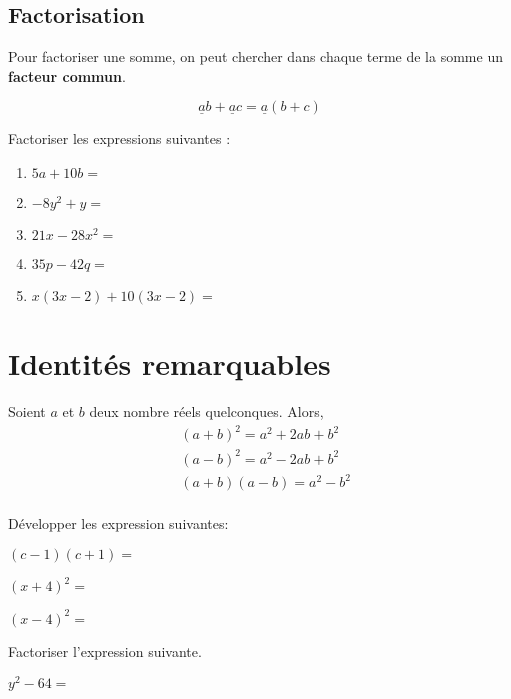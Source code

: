 \documentclass{poly}
\begin{document}
\newpage
\subsection{Factorisation}
\begin{tcolorbox}
Pour factoriser une somme, on peut chercher dans chaque terme de la somme un \textbf{facteur commun}.
\end{tcolorbox}
\begin{equation*}
\underline{a}b + \underline{a}c = \underline{a}(b + c)
\end{equation*}
\begin{example}
Factoriser les expressions suivantes :
\begin{enumerate}[label=\emph{\alph*)}]
\item $5a + 10b =$ \answerline
\item $-8y^2 + y =$ \answerline
\item $21x - 28x^2 =$ \answerline
\item $35p - 42q =$ \answerline
\item $x(3x - 2) + 10(3x - 2) =$ \answerline
\end{enumerate}
\end{example}
\section{Identités remarquables}
\begin{proposition}
Soient $a$ et $b$ deux nombre réels quelconques. Alors,
\begin{equation*}
\begin{aligned}
&(a + b)^2 = a^2 + 2ab + b^2\\ 
&(a - b)^2 = a^2 - 2ab + b^2\\ 
&(a + b)(a - b) = a^2 - b^2\\ 
\end{aligned}
\end{equation*}
\end{proposition}
\begin{example}
Développer les expression suivantes:
\begin{alphaquestions}
\item $(c-1)(c+1)=$ \answerline
\item $(x+4)^2=$ \answerline
\item $(x-4)^2=$ \answerline
\end{alphaquestions}    
\end{example}
\vspace*{0.5cm}
\begin{example}
Factoriser l'expression suivante. 

$y^2 - 64 =$ \answerline
\end{example}
\newpage
\end{document}
